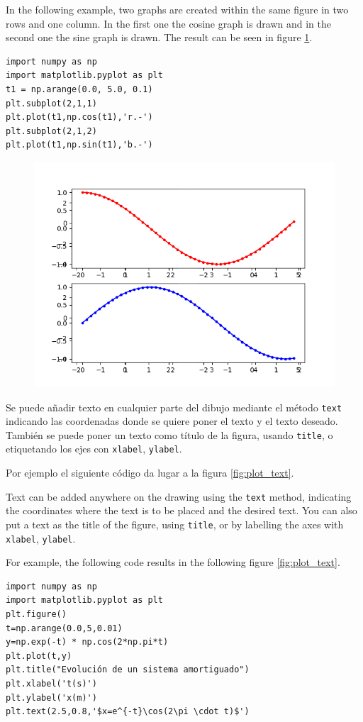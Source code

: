 \begin{paracol}{2}
In the following example, two graphs are created within the same figure in two rows and one column. In the first one the cosine graph is drawn and in the second one the sine graph is drawn. The result can be seen in figure \ref{fig:subplot_01}.

\begin{verbatim}
import numpy as np
import matplotlib.pyplot as plt
t1 = np.arange(0.0, 5.0, 0.1)
plt.subplot(2,1,1)
plt.plot(t1,np.cos(t1),'r.-')
plt.subplot(2,1,2)
plt.plot(t1,np.sin(t1),'b.-')
\end{verbatim}
\end{paracol}

\begin{figure}
    \centering
    \includegraphics[width=0.75\linewidth]{figuras/subplot_01.png}
    \label{fig:subplot_01}
\end{figure}

\begin{paracol}{2}
    Se puede añadir texto en cualquier parte del dibujo mediante el método \texttt{text} indicando las coordenadas donde se quiere poner el texto y el texto deseado. También se puede poner un texto como título de la figura, usando \texttt{title}, o etiquetando los ejes con \texttt{xlabel}, \texttt{ylabel}.

Por ejemplo el siguiente código da lugar a la figura \ref{fig:plot_text}.
  
\switchcolumn
Text can be added anywhere on the drawing using the \texttt{text} method, indicating the coordinates where the text is to be placed and the desired text. You can also put a text as the title of the figure, using \texttt{title}, or by labelling the axes with \texttt{xlabel}, \texttt{ylabel}.

For example, the following code results in the following figure \ref{fig:plot_text}.
 
\end{paracol}
 \begin{verbatim}
import numpy as np
import matplotlib.pyplot as plt
plt.figure()
t=np.arange(0.0,5,0.01)
y=np.exp(-t) * np.cos(2*np.pi*t)
plt.plot(t,y)
plt.title("Evolución de un sistema amortiguado")
plt.xlabel('t(s)')
plt.ylabel('x(m)')
plt.text(2.5,0.8,'$x=e^{-t}\cos(2\pi \cdot t)$')
    \end{verbatim}
    
